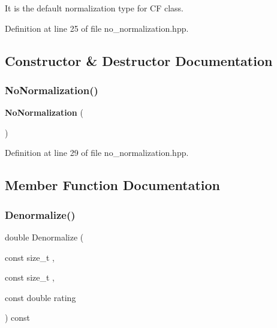 It is the default normalization type for CF class. 

Definition at line 25 of file no\+\_\+normalization.\+hpp.



\subsection{Constructor \& Destructor Documentation}
\mbox{\label{classmlpack_1_1cf_1_1NoNormalization_aeb690ed25fc34f9f9ce3771e6076026b}} 
\subsubsection{No\+Normalization()}
{\footnotesize\ttfamily \textbf{ No\+Normalization} (\begin{DoxyParamCaption}{ }\end{DoxyParamCaption})\hspace{0.3cm}{\ttfamily [inline]}}



Definition at line 29 of file no\+\_\+normalization.\+hpp.



\subsection{Member Function Documentation}
\mbox{\label{classmlpack_1_1cf_1_1NoNormalization_a1bf7d88b868311ad7ea9967146036e2e}} 
\subsubsection{Denormalize()\hspace{0.1cm}{\footnotesize\ttfamily [1/2]}}
{\footnotesize\ttfamily double Denormalize (\begin{DoxyParamCaption}\item[{const size\+\_\+t}]{,  }\item[{const size\+\_\+t}]{,  }\item[{const double}]{rating }\end{DoxyParamCaption}) const\hspace{0.3cm}{\ttfamily [inline]}}



